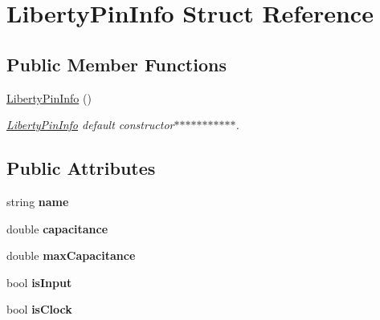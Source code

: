\hypertarget{structLibertyPinInfo}{\section{Liberty\-Pin\-Info Struct Reference}
\label{structLibertyPinInfo}
}
\subsection*{Public Member Functions}
\begin{DoxyCompactItemize}
\item 
\hyperlink{structLibertyPinInfo_a268a64137463b6b6fdc87ed036184e45}{Liberty\-Pin\-Info} ()
\begin{DoxyCompactList}\small\item\em \hyperlink{structLibertyPinInfo}{Liberty\-Pin\-Info} default constructor$\ast$$\ast$$\ast$$\ast$$\ast$$\ast$$\ast$$\ast$$\ast$$\ast$$\ast$. \end{DoxyCompactList}\end{DoxyCompactItemize}
\subsection*{Public Attributes}
\begin{DoxyCompactItemize}
\item 
\hypertarget{structLibertyPinInfo_a4421a56d0603f0d8371a48c123832aed}{string {\bfseries name}}\label{structLibertyPinInfo_a4421a56d0603f0d8371a48c123832aed}

\item 
\hypertarget{structLibertyPinInfo_a8668778fc79c36a4cdcedf9a3f7e91b4}{double {\bfseries capacitance}}\label{structLibertyPinInfo_a8668778fc79c36a4cdcedf9a3f7e91b4}

\item 
\hypertarget{structLibertyPinInfo_a8eb7d3102925e3ecf9906ade7c82b0b7}{double {\bfseries max\-Capacitance}}\label{structLibertyPinInfo_a8eb7d3102925e3ecf9906ade7c82b0b7}

\item 
\hypertarget{structLibertyPinInfo_a57daad21ecac17f40631e0c563f7f39d}{bool {\bfseries is\-Input}}\label{structLibertyPinInfo_a57daad21ecac17f40631e0c563f7f39d}

\item 
\hypertarget{structLibertyPinInfo_a8200642f454380e2e22f4158d471c302}{bool {\bfseries is\-Clock}}\label{structLibertyPinInfo_a8200642f454380e2e22f4158d471c302}

\end{DoxyCompactItemize}


